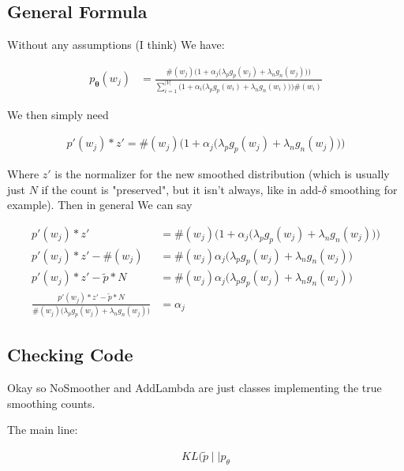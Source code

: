 \documentclass{article}
\newcommand{\vtheta}{\boldsymbol{\theta}}
\newcommand{\model}{p_{\vtheta}}
\begin{document}
	\subsection{General Formula}
	
		Without any assumptions (I think) We have:
	
		\begin{align}
			\model(w_j)&= \frac{\#(w_j)\bigg(1 +\alpha_j\bigg(\lambda_p g_p(w_j) +\lambda_n g_n(w_j)\bigg)\bigg)}{\sum^{|V|}_{i=1} \bigg(1 +\alpha_i\bigg(\lambda_p g_p(w_i) +\lambda_n g_n(w_i)\bigg)\bigg)\#(w_i)}
		\end{align}
		
		We then simply need
		
		\begin{align}
			p'(w_j)*z' = \#(w_j)\bigg(1 +\alpha_j\bigg(\lambda_p g_p(w_j) +\lambda_n g_n(w_j)\bigg)\bigg)
		\end{align}
		
		Where $z'$ is the normalizer for the new smoothed distribution (which is usually just $N$ if the count is "preserved", but it isn't always, like in add-$\delta$ smoothing for example). Then in general We can say
		
		\begin{align}
			p'(w_j)*z' &= \#(w_j)\bigg(1 +\alpha_j\bigg(\lambda_p g_p(w_j) +\lambda_n g_n(w_j)\bigg)\bigg)\\
			p'(w_j)*z' - \#(w_j) &= \#(w_j)\alpha_j\bigg(\lambda_p g_p(w_j) +\lambda_n g_n(w_j)\bigg)\\
			p'(w_j)*z' - \tilde{p}*N &= \#(w_j)\alpha_j\bigg(\lambda_p g_p(w_j) +\lambda_n g_n(w_j)\bigg)\\
			\frac{p'(w_j)*z' - \tilde{p}*N}{\#(w_j) \big(\lambda_p g_p(w_j) +\lambda_n g_n(w_j)\big)} &= \alpha_j
		\end{align}
		
	\subsection{Checking Code}
	
		Okay so NoSmoother and AddLambda are just classes implementing the true smoothing counts.
		
		The main line:
		
		\begin{align}
			KL(\tilde{p}\mid\mid p_\theta
		\end{align}






		
		
		
		
		
		
		
		
		
\end{document}
